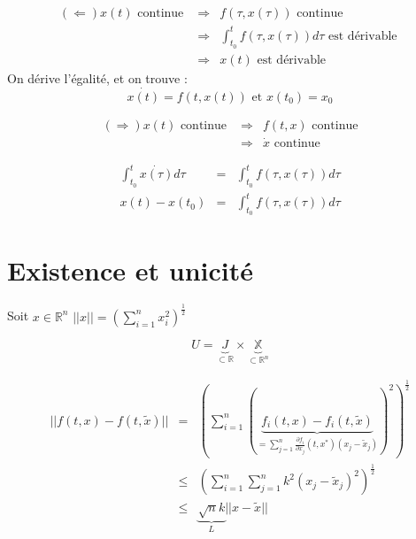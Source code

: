 \begin{dem}
\begin{eqnarray*}
(\Leftarrow) x(t) \text{ continue } &\Rightarrow& f(\tau,x(\tau)) \text{ continue } \\
    &\Rightarrow& \int_{t_0}^t f(\tau, x(\tau)) d\tau \text{ est dérivable } \\
    &\Rightarrow& x(t) \text{ est dérivable }
\end{eqnarray*}
On dérive l'égalité, et on trouve : 
\[\dot{x(t)}=f(t,x(t)) \text{ et } x(t_0)=x_0\]

\begin{eqnarray*}
(\Rightarrow) x(t) \text{ continue } &\Rightarrow& f(t,x)\text{ continue} \\
   &\Rightarrow& \dot{x} \text{ continue}
\end{eqnarray*}

\begin{eqnarray*}
\int_{t_0}^t \dot{x(\tau)} d\tau &=& \int_{t_0}^t f(\tau, x(\tau)) d\tau \\
x(t)-x(t_0)&=&\int_{t_0}^t f(\tau, x(\tau)) d\tau
\end{eqnarray*}
\end{dem}

\section{Existence et unicité}
Soit $x\in\mathbb{R}^n$ $||x||=\left(\sum_{i=1}^n x_i^2\right)^{\frac{1}{2}}$

\[U=\underbrace{J}_{\subset \mathbb{R}} \times \underbrace{\mathbb{X}}_{\subset \mathbb{R}^n}\]



\begin{dem}
\begin{eqnarray*}
||f(t,x)-f(t,\tilde{x})||&=&\left(\sum_{i=1}^n (\underbrace{f_i(t,x)-f_i(t,\tilde{x})}_{=\sum_{j=1}^n \frac{\partial f_i}{\partial x_j}(t,x^*)(x_j-\tilde{x}_j)})^2 \right)^{\frac{1}{2}} \\
	&\leq& \left( \sum_{i=1}^n \sum_{j=1}^n k^2 (x_j-\tilde{x}_j)^2 \right)^{\frac{1}{2}} \\
	&\leq& \underbrace{\sqrt{n} k}_{L} ||x-\tilde{x}||
\end{eqnarray*}
\end{dem}

